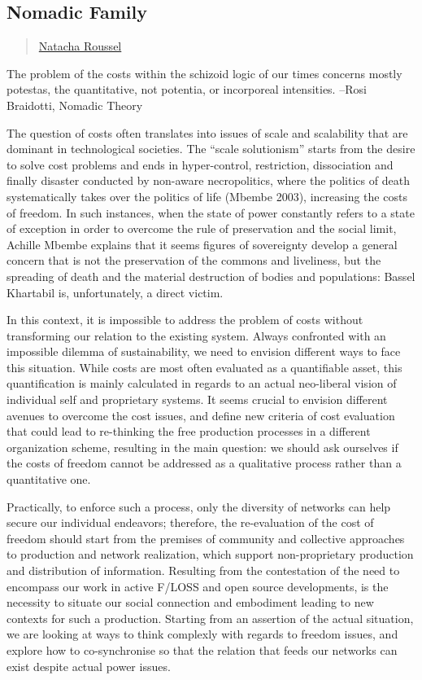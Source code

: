 \subsection{Nomadic Family}\label{nomadic-family}

\begin{quote}
\href{../appendix/attributions.html\#natacha-roussel}{Natacha Roussel}
\end{quote}

The problem of the costs within the schizoid logic of our times concerns
mostly potestas, the quantitative, not potentia, or incorporeal
intensities. --Rosi Braidotti, Nomadic Theory

The question of costs often translates into issues of scale and
scalability that are dominant in technological societies. The ``scale
solutionism'' starts from the desire to solve cost problems and ends in
hyper-control, restriction, dissociation and finally disaster conducted
by non-aware necropolitics, where the politics of death systematically
takes over the politics of life (Mbembe 2003), increasing the costs of
freedom. In such instances, when the state of power constantly refers to
a state of exception in order to overcome the rule of preservation and
the social limit, Achille Mbembe explains that it seems figures of
sovereignty develop a general concern that is not the preservation of
the commons and liveliness, but the spreading of death and the material
destruction of bodies and populations: Bassel Khartabil is,
unfortunately, a direct victim.

In this context, it is impossible to address the problem of costs
without transforming our relation to the existing system. Always
confronted with an impossible dilemma of sustainability, we need to
envision different ways to face this situation. While costs are most
often evaluated as a quantifiable asset, this quantification is mainly
calculated in regards to an actual neo-liberal vision of individual self
and proprietary systems. It seems crucial to envision different avenues
to overcome the cost issues, and define new criteria of cost evaluation
that could lead to re-thinking the free production processes in a
different organization scheme, resulting in the main question: we should
ask ourselves if the costs of freedom cannot be addressed as a
qualitative process rather than a quantitative one.

Practically, to enforce such a process, only the diversity of networks
can help secure our individual endeavors; therefore, the re-evaluation
of the cost of freedom should start from the premises of community and
collective approaches to production and network realization, which
support non-proprietary production and distribution of information.
Resulting from the contestation of the need to encompass our work in
active F/LOSS and open source developments, is the necessity to situate
our social connection and embodiment leading to new contexts for such a
production. Starting from an assertion of the actual situation, we are
looking at ways to think complexly with regards to freedom issues, and
explore how to co-synchronise so that the relation that feeds our
networks can exist despite actual power issues.

